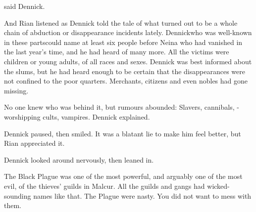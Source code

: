  said Dennick. 





And Rian listened as Dennick told the tale of what turned out to be a whole chain of abduction or disappearance incidents lately. 
Dennick\dash who was well-known in these parts\dash could name at least six people before Neina who had vanished in the last year's time, and he had heard of many more. 
All the victims were children or young adults, of all races and sexes. 
Dennick was best informed about the slums, but he had heard enough to be certain that the disappearances were not confined to the poor quarters. 
Merchants, citizens and even nobles had gone missing. 

No one knew who was behind it, but rumours abounded: 
Slavers, cannibals, \daemon-worshipping cults, vampires. 
 Dennick explained. 




Dennick paused, then smiled. 
It was a blatant lie to make him feel better, but Rian appreciated it. 


 Dennick looked around nervously, then leaned in. 

The Black Plague was one of the most powerful, and arguably one of the most evil, of the thieves' guilds in Malcur. 
All the guilds and gangs had wicked-sounding names like that. 
The Plague were nasty. 
You did not want to mess with them. 

